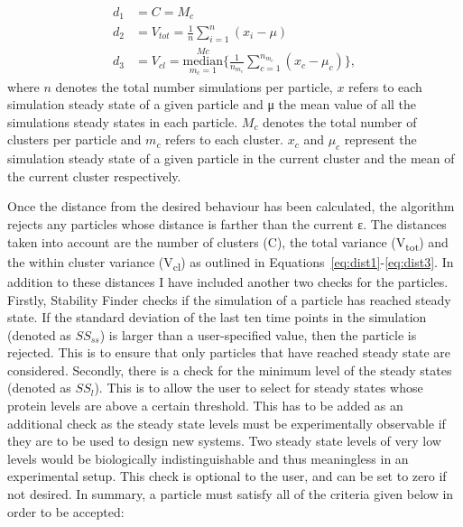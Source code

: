 \begin{align}
	d_1 &= C = M_c \label{eq:dist1}\\
	d_2 &= V_{tot} = \frac{1}{n} \sum_{i=1}^{n}(x_i- \mu)	\label{eq:dist1}\\
	d_3 &= V_{cl} =  \underset{m_c = 1}{\overset{Mc}{\mathrm{median}}} \{ \frac{1}{n_{m_c}} \sum_{c=1}^{n_{m_c}}(x_c- \mu_c)\} \label{eq:dist3},
\end{align}
where $n$ denotes the total number simulations per particle, $x$ refers to each  simulation steady state of a given particle and μ the mean value of all the simulations steady states in each particle. $M_c$ denotes the total number of clusters per particle and $m_c$ refers to each cluster. $x_c$ and $\mu_c$ represent the simulation steady state of a given particle in the current cluster and the mean of the current cluster respectively.   



Once the distance from the desired behaviour has been calculated, the algorithm rejects any particles whose distance is farther than the current ε. The distances taken into account are the number of clusters (C), the total variance (V\textsubscript{tot}) and the within cluster variance (V\textsubscript{cl}) as outlined in Equations~\ref{eq:dist1}-\ref{eq:dist3}. In addition to these distances I have included another two checks for the particles. Firstly, Stability Finder checks if the simulation of a particle has reached steady state. If the standard deviation of the last ten time points in the simulation (denoted as $SS_{ss}$) is larger than a user-specified value, then the particle is rejected. This is to ensure that only particles that have reached steady state are considered. Secondly, there is a check for the minimum level of the steady states (denoted as $SS_{l}$). This is to allow the user to select for steady states whose protein levels are above a certain threshold. This has to be added as an additional check as the steady state levels must be experimentally observable if they are to be used to design new systems. Two steady state levels of very low levels would be biologically indistinguishable and thus meaningless in an experimental setup. This check is optional to the user, and can be set to zero if not desired. In summary, a particle must satisfy all of the criteria given below in order to be accepted:

